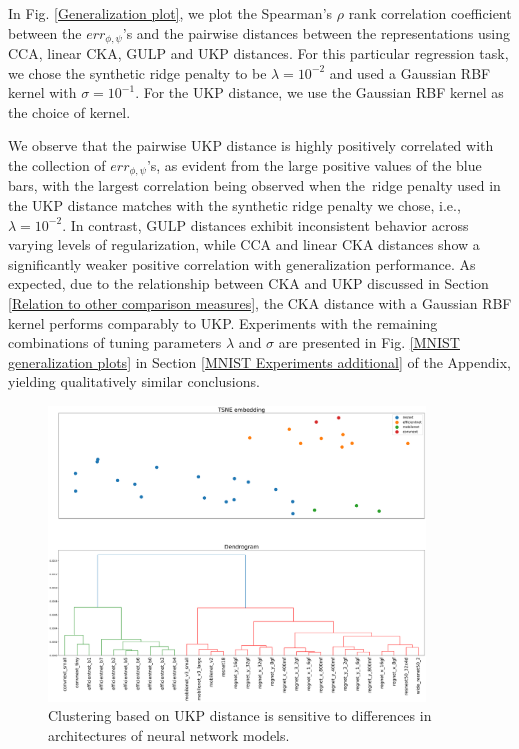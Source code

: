 \documentclass[11pt]{article}
\newcommand{\repone}{\phi}
\newcommand{\reptwo}{\psi}
\newcommand{\metricstname}{UKP }
\theoremstyle{plain}
\begin{document}
In Fig. \ref{Generalization plot}, we plot the Spearman's $\rho$ rank correlation coefficient between the $err_{\repone,\reptwo}$'s and the pairwise distances between the representations using CCA, linear CKA, GULP and UKP distances. For this particular regression task, we chose the synthetic ridge penalty to be $\lambda=10^{-2}$ and used a Gaussian RBF kernel with $\sigma=10^{-1}$. For the \metricstname distance, we use the Gaussian RBF kernel as the choice of kernel.

We observe that the pairwise \metricstname distance is highly positively correlated with the collection of $err_{\repone,\reptwo}$'s, as evident from the large positive values of the blue bars, with the largest correlation being observed when the ridge penalty used in the \metricstname distance matches with the synthetic ridge penalty we chose, i.e., $\lambda=10^{-2}$. In contrast, GULP distances exhibit inconsistent behavior across varying levels of regularization, while CCA and linear CKA distances show a significantly weaker positive correlation with generalization performance. As expected, due to the relationship between CKA and \metricstname discussed in Section \ref{Relation to other comparison measures}, the CKA distance with a Gaussian RBF kernel performs comparably to UKP. 
Experiments with the remaining combinations of tuning parameters $\lambda$ and $\sigma$ are presented in Fig. \ref{MNIST generalization plots} in Section \ref{MNIST Experiments additional} of the Appendix, yielding qualitatively similar conclusions.

\begin{figure}[t]
\begin{center}
\includegraphics[width=10cm]{Figures/DendogramtSNE_imagenet/DendogramandTSNE for UKP_dist_RBF_1.000000e+00_1.000000e+01.png}
\caption{Clustering based on \metricstname distance is sensitive to differences in architectures of neural network models.}\label{DendrogramandtSNE}
\end{center}
\vspace{-4mm}
\end{figure}
\end{document}
